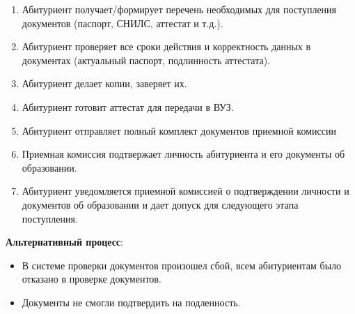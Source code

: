 \documentclass[areasetadvanced]{scrartcl}
\begin{document}
\begin{enumerate}
    \item Абитуриент получает/формирует перечень необходимых для поступления документов (паспорт, СНИЛС, аттестат и т.д.).
    \item Абитуриент проверяет все сроки действия и корректность данных в документах (актуальный паспорт, подлинность аттестата).
    \item Абитуриент делает копии, заверяет их.
    \item Абитуриент готовит аттестат для передачи в ВУЗ.
    \item Абитуриент отправляет полный комплект документов приемной комиссии
    \item Приемная комиссия подтвержает личность абитуриента и его документы об образовании.
    \item Абитуриент уведомляется приемной комиссией о подтверждении личности и документов об образовании и дает допуск для следующего этапа поступления.
\end{enumerate}
\textbf{Альтернативный процесс}:
\begin{itemize}
    \item В системе проверки документов произошел сбой, всем абитуриентам было отказано в проверке документов. 
    \item Документы не смогли подтвердить на подленность.
\end{itemize}
\newpage
\end{document}
